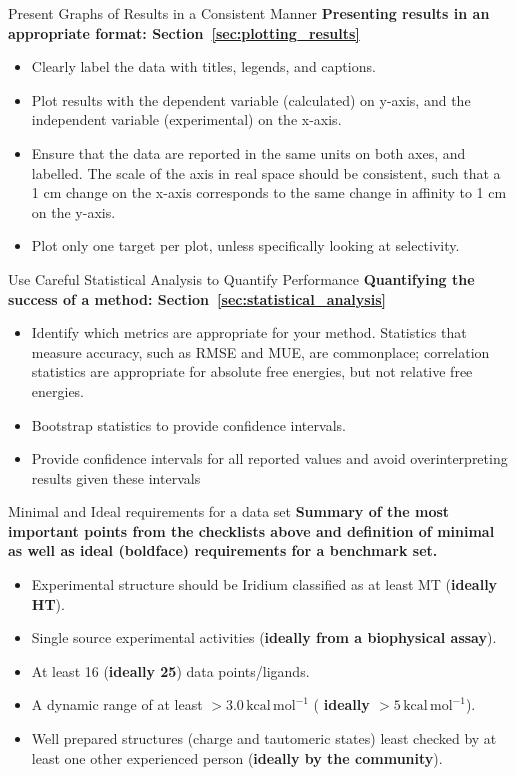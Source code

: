 \documentclass[9pt,bestpractices]{livecoms}
\def\ligcountthres{16}
\def\ligrangethres{3.0}
\begin{document}
\begin{Checklists*}
\begin{checklist}{Present Graphs of Results in a Consistent Manner}
\textbf{Presenting results in an appropriate format: Section~\ref{sec:plotting_results}}
\begin{itemize}
\item Clearly label the data with titles, legends, and captions.
\item Plot results with the dependent variable (calculated) on y-axis, and the independent variable (experimental) on the x-axis. 
\item Ensure that the data are reported in the same units on both axes, and labelled. The scale of the axis in real space should be consistent, such that a 1 cm change on the x-axis corresponds to the same change in affinity to 1 cm on the y-axis.
\item Plot only one target per plot, unless specifically looking at selectivity.
\end{itemize}
\end{checklist}

\begin{checklist}{Use Careful Statistical Analysis to Quantify Performance}
\textbf{Quantifying the success of a method: Section~\ref{sec:statistical_analysis}}
\begin{itemize}
\item Identify which metrics are appropriate for your method. Statistics that measure accuracy, such as RMSE and MUE, are commonplace; correlation statistics are appropriate for absolute free energies, but not relative free energies.
\item Bootstrap statistics to provide confidence intervals. 
\item Provide confidence intervals for all reported values and avoid overinterpreting results given these intervals
\end{itemize}
\end{checklist}

\begin{checklist}{Minimal and Ideal requirements for a data set}
\textbf{Summary of the most important points from the checklists above and definition of minimal as well as ideal (boldface) requirements for a benchmark set.}
    \begin{itemize}
        \item Experimental structure should be Iridium classified as at least MT (\textbf{ideally HT}).
        \item Single source experimental activities (\textbf{ideally from a biophysical assay}).
        \item At least \ligcountthres{} (\textbf{ideally 25}) data points/ligands.
        \item A dynamic range of at least $>\ligrangethres{}\,\mathrm{kcal\,mol^{-1}}$ ( \textbf{ideally $>5\,\mathrm{kcal\,mol^{-1}}$}).
        \item Well prepared structures (charge and tautomeric states) least checked by at least one other experienced person (\textbf{ideally by the community}).
    \end{itemize}
\end{checklist}


\end{Checklists*}
\end{document}
